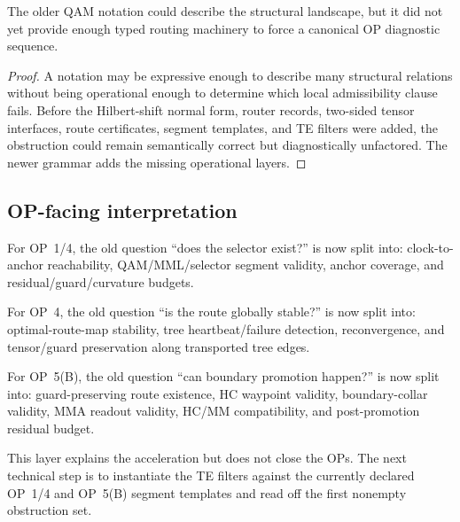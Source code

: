 \begin{proposition}
\label{prop:v410r17-old-qam-expressive-not-operational}
The older QAM notation could describe the structural landscape, but it did not
yet provide enough typed routing machinery to force a canonical OP diagnostic
sequence.
\end{proposition}

\begin{proof}
A notation may be expressive enough to describe many structural relations
without being operational enough to determine which local admissibility clause
fails. Before the Hilbert-shift normal form, router records, two-sided tensor
interfaces, route certificates, segment templates, and TE filters were added,
the obstruction could remain semantically correct but diagnostically
unfactored. The newer grammar adds the missing operational layers.
\end{proof}

\subsection{OP-facing interpretation}
\label{subsec:v410r17-op-facing-interpretation}

\begin{remark}[OP~1/4]
\label{rem:v410r17-op14-interpretation}
For OP~1/4, the old question ``does the selector exist?'' is now split into:
clock-to-anchor reachability, QAM/MML/selector segment validity, anchor
coverage, and residual/guard/curvature budgets.
\end{remark}

\begin{remark}[OP~4]
\label{rem:v410r17-op4-interpretation}
For OP~4, the old question ``is the route globally stable?'' is now split into:
optimal-route-map stability, tree heartbeat/failure detection, reconvergence,
and tensor/guard preservation along transported tree edges.
\end{remark}

\begin{remark}[OP~5(B)]
\label{rem:v410r17-op5b-interpretation}
For OP~5(B), the old question ``can boundary promotion happen?'' is now split
into: guard-preserving route existence, HC waypoint validity, boundary-collar
validity, MMA readout validity, HC/MM compatibility, and post-promotion
residual budget.
\end{remark}

\begin{remark}
\label{rem:v410r17-status}
This layer explains the acceleration but does not close the OPs. The next
technical step is to instantiate the TE filters against the currently
declared OP~1/4 and OP~5(B) segment templates and read off the first nonempty
obstruction set.
\end{remark}



